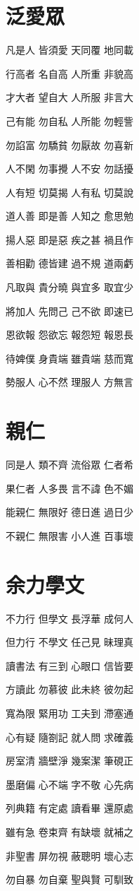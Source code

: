 \documentclass[12pt,a4paper]{ctexbook}
\begin{document}
\section{泛愛眾}
凡是人 皆須愛 天同覆 地同載\par
行高者 名自高 人所重 非貌高\par
才大者 望自大 人所服 非言大\par
己有能 勿自私 人所能 勿輕訾\par
勿諂富 勿驕貧 勿厭故 勿喜新\par
人不閑 勿事攪 人不安 勿話擾\par
人有短 切莫揭 人有私 切莫說\par
道人善 即是善 人知之 愈思勉\par
揚人惡 即是惡 疾之甚 禍且作\par
善相勸 德皆建 過不規 道兩虧\par
凡取與 貴分曉 與宜多 取宜少\par
將加人 先問己 己不欲 即速已\par
恩欲報 怨欲忘 報怨短 報恩長\par
待婢僕 身貴端 雖貴端 慈而寬\par
勢服人 心不然 理服人 方無言\par

\section{親仁}
同是人 類不齊 流俗眾 仁者希\par
果仁者 人多畏 言不諱 色不媚\par
能親仁 無限好 德日進 過日少\par
不親仁 無限害 小人進 百事壞\par

\section{余力學文}
不力行 但學文 長浮華 成何人\par
但力行 不學文 任己見 昧理真\par
讀書法 有三到 心眼口 信皆要\par
方讀此 勿慕彼 此未終 彼勿起\par
寬為限 緊用功 工夫到 滯塞通\par
心有疑 隨劄記 就人問 求確義\par
房室清 牆壁淨 幾案潔 筆硯正\par
墨磨偏 心不端 字不敬 心先病\par
列典籍 有定處 讀看畢 還原處\par
雖有急 卷束齊 有缺壞 就補之\par
非聖書 屏勿視 蔽聰明 壞心志\par
勿自暴 勿自棄 聖與賢 可馴致\par
\end{document}
